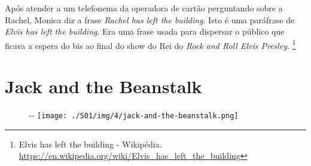 Após atender a um telefonema da operadora de cartão perguntando sobre a
Rachel, Monica diz a frase \emph{Rachel has left the building}. Isto é
uma paráfrase de \emph{Elvis has left the building}. Era uma frase usada
para dispersar o público que ficava a espera do bis ao final do show do
Rei do \emph{Rock and Roll Elvis Presley}. \footnote{\sloppy Elvis has left the building - Wikipédia. \url{https://en.wikipedia.org/wiki/Elvis_has_left_the_building}}

\hypertarget{jack-and-the-beanstalk}{%
\section{Jack and the Beanstalk}\label{jack-and-the-beanstalk}}

\begin{figure}[!ht]
  \begin{adjustwidth}{-\oddsidemargin-1in}{-\rightmargin}
    \centering
    \texttt{[image: ./S01/img/4/jack-and-the-beanstalk.png]}
  \end{adjustwidth}
\end{figure}


